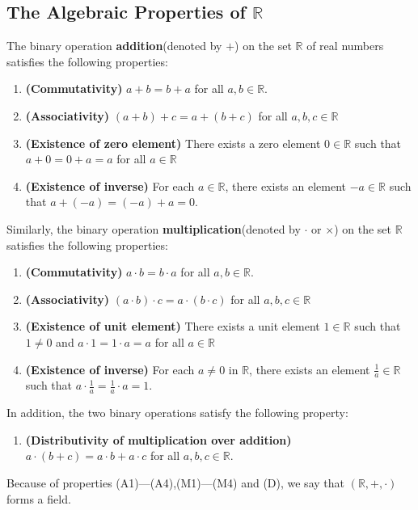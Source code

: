 \documentclass[8pt]{article}
\theoremstyle{definition}
\begin{document}
\subsection{The Algebraic Properties of $\mathbb{R}$}
The binary operation \textbf{addition}(denoted by $+$) on the set $\mathbb{R}$ of real numbers satisfies the following properties:
\begin{enumerate}[label=(A\arabic*)]
\item \textbf{(Commutativity)} $a+b=b+a$ for all $a,b\in\mathbb{R}$.
\item \textbf{(Associativity)} $(a+b)+c=a+(b+c)$ for all $a,b,c\in\mathbb{R}$
\item \textbf{(Existence of zero element)} There exists a zero element $0\in\mathbb{R}$ such that $a+0=0+a=a$ for all $a\in\mathbb{R}$
\item \textbf{(Existence of inverse)} For each $a\in\mathbb{R}$, there exists an element $-a\in\mathbb{R}$ such that $a+(-a)=(-a)+a=0$.
\end{enumerate} 
Similarly, the binary operation \textbf{multiplication}(denoted by $\cdot$ or $\times$) on the set $\mathbb{R}$ satisfies the following properties:
\begin{enumerate}[label=(M\arabic*)]
\item \textbf{(Commutativity)} $a\cdot b=b\cdot a$ for all $a,b\in\mathbb{R}$.
\item \textbf{(Associativity)} $(a\cdot b)\cdot c=a\cdot(b\cdot c)$ for all $a,b,c\in\mathbb{R}$
\item \textbf{(Existence of unit element)} There exists a unit element $1\in\mathbb{R}$ such that $1\neq 0$ and $a\cdot 1=1\cdot a=a$ for all $a\in\mathbb{R}$
\item \textbf{(Existence of inverse)} For each $a\neq 0$ in $\mathbb{R}$, there exists an element $\frac{1}{a}\in\mathbb{R}$ such that $a\cdot\frac{1}{a}=\frac{1}{a}\cdot a=1$.
\end{enumerate} 
In addition, the two binary operations satisfy the following property:
\begin{enumerate}[label=(D)]
\item \textbf{(Distributivity of multiplication over addition)} $a\cdot(b+c)=a\cdot b + a\cdot c$ for all $a,b,c\in\mathbb{R}$.
\end{enumerate}
Because of properties (A1)---(A4),(M1)---(M4) and (D), we say that $(\mathbb{R},+,\cdot)$ forms a field.
\end{document}
